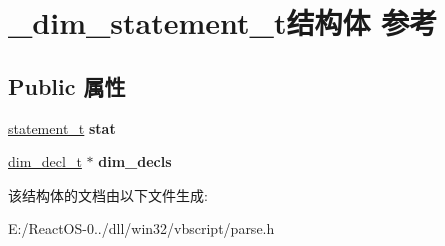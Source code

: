 \hypertarget{struct__dim__statement__t}{}\section{\+\_\+dim\+\_\+statement\+\_\+t结构体 参考}
\label{struct__dim__statement__t}
\subsection*{Public 属性}
\begin{DoxyCompactItemize}
\item 
\mbox{\label{struct__dim__statement__t_a7288ca0c541aa6d32d73942488f5915a}} 
\hyperlink{struct__statement__t}{statement\+\_\+t} {\bfseries stat}
\item 
\mbox{\label{struct__dim__statement__t_a23e68fe1f262e711c22d964344e2dac0}} 
\hyperlink{struct__dim__decl__t}{dim\+\_\+decl\+\_\+t} $\ast$ {\bfseries dim\+\_\+decls}
\end{DoxyCompactItemize}


该结构体的文档由以下文件生成\+:\begin{DoxyCompactItemize}
\item 
E\+:/\+React\+O\+S-\/0../dll/win32/vbscript/parse.\+h\end{DoxyCompactItemize}

